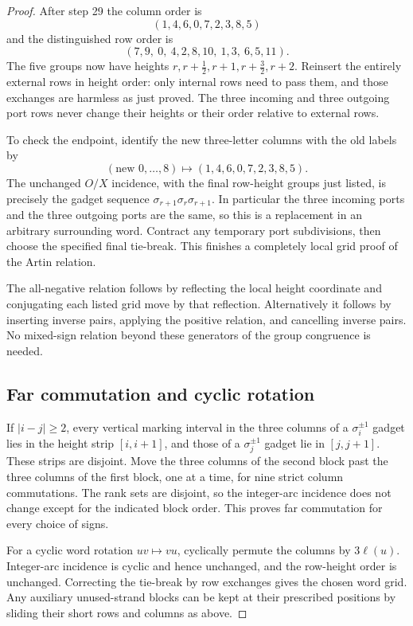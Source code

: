 \documentclass[11pt,a4paper]{article}
\theoremstyle{remark}
\begin{document}
\begin{proof}
After step 29 the column order is
\[
 (1,4,6,0,7,2,3,8,5)
\]
and the distinguished row order is
\[
 (7,9,\ 0,\ 4,2,8,10,\ 1,3,\ 6,5,11).
\]
The five groups now have heights
$r,r+\tfrac12,r+1,r+\tfrac32,r+2$.  Reinsert the entirely external rows
in height order: only internal rows need to pass them, and those
exchanges are harmless as just proved.  The three incoming and three
outgoing port rows never change their heights or their order relative
to external rows.

To check the endpoint, identify the new three-letter columns with the
old labels by
\[
 (\text{new }0,\ldots,8)\longmapsto(1,4,6,0,7,2,3,8,5).
\]
The unchanged $O/X$ incidence, with the final row-height groups just
listed, is precisely the gadget sequence
$\sigma_{r+1}\sigma_r\sigma_{r+1}$.  In particular the three incoming
ports and the three outgoing ports are the same, so this is a
replacement in an arbitrary surrounding word.  Contract any temporary
port subdivisions, then choose the specified final tie-break.  This
finishes a completely local grid proof of the Artin relation.

The all-negative relation follows by reflecting the local height
coordinate and conjugating each listed grid move by that reflection.
Alternatively it follows by inserting inverse pairs, applying the
positive relation, and cancelling inverse pairs.  No mixed-sign
relation beyond these generators of the group congruence is needed.

\subsection{Far commutation and cyclic rotation}

If $|i-j|\ge2$, every vertical marking interval in the three columns
of a $\sigma_i^{\pm1}$ gadget lies in the height strip $[i,i+1]$, and
those of a $\sigma_j^{\pm1}$ gadget lie in $[j,j+1]$.  These strips are
disjoint.  Move the three columns of the second block past the three
columns of the first block, one at a time, for nine strict column
commutations.  The rank sets are disjoint, so the integer-arc incidence
does not change except for the indicated block order.  This proves far
commutation for every choice of signs.

For a cyclic word rotation $uv\mapsto vu$, cyclically permute the
columns by $3\ell(u)$.  Integer-arc incidence is cyclic and hence
unchanged, and the row-height order is unchanged.  Correcting the
tie-break by row exchanges gives the chosen word grid.  Any auxiliary
unused-strand blocks can be kept at their prescribed positions by
sliding their short rows and columns as above.


\end{proof}
\end{document}
